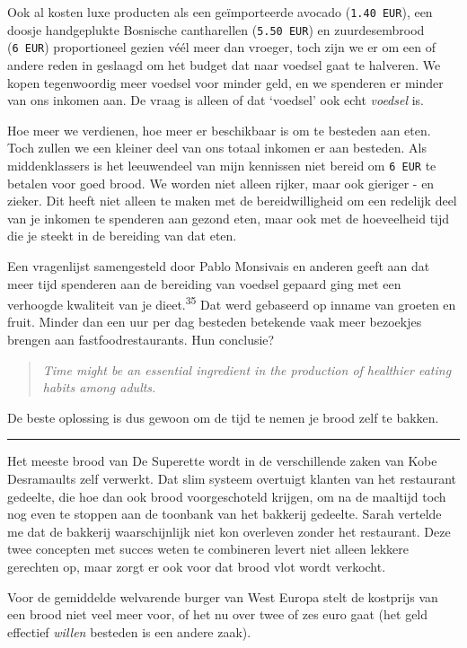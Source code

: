 \documentclass[
  11pt,
  dutch,
]{memoir}
\begin{document}
Ook al kosten luxe producten als een geïmporteerde avocado
(\texttt{1.40\ EUR}), een doosje handgeplukte Bosnische cantharellen
(\texttt{5.50\ EUR}) en zuurdesembrood (\texttt{6\ EUR}) proportioneel
gezien véél meer dan vroeger, toch zijn we er om een of andere reden in
geslaagd om het budget dat naar voedsel gaat te halveren. We kopen
tegenwoordig meer voedsel voor minder geld, en we spenderen er minder
van ons inkomen aan. De vraag is alleen of dat `voedsel' ook echt
\emph{voedsel} is.

Hoe meer we verdienen, hoe meer er beschikbaar is om te besteden aan
eten. Toch zullen we een kleiner deel van ons totaal inkomen er aan
besteden. Als middenklassers is het leeuwendeel van mijn kennissen niet
bereid om \texttt{6\ EUR} te betalen voor goed brood. We worden niet
alleen rijker, maar ook gieriger - en zieker. Dit heeft niet alleen te
maken met de bereidwilligheid om een redelijk deel van je inkomen te
spenderen aan gezond eten, maar ook met de hoeveelheid tijd die je
steekt in de bereiding van dat eten.

Een vragenlijst samengesteld door Pablo Monsivais en anderen geeft aan
dat meer tijd spenderen aan de bereiding van voedsel gepaard ging met
een verhoogde kwaliteit van je dieet.\textsuperscript{35} Dat werd
gebaseerd op inname van groeten en fruit. Minder dan een uur per dag
besteden betekende vaak meer bezoekjes brengen aan fastfoodrestaurants.
Hun conclusie?

\begin{quote}
\emph{Time might be an essential ingredient in the production of
healthier eating habits among adults.}
\end{quote}

De beste oplossing is dus gewoon om de tijd te nemen je brood zelf te
bakken.

\pfbreak

Het meeste brood van De Superette wordt in de verschillende zaken van
Kobe Desramaults zelf verwerkt. Dat slim systeem overtuigt klanten van
het restaurant gedeelte, die hoe dan ook brood voorgeschoteld krijgen,
om na de maaltijd toch nog even te stoppen aan de toonbank van het
bakkerij gedeelte. Sarah vertelde me dat de bakkerij waarschijnlijk niet
kon overleven zonder het restaurant. Deze twee concepten met succes
weten te combineren levert niet alleen lekkere gerechten op, maar zorgt
er ook voor dat brood vlot wordt verkocht.

Voor de gemiddelde welvarende burger van West Europa stelt de kostprijs
van een brood niet veel meer voor, of het nu over twee of zes euro gaat
(het geld effectief \emph{willen} besteden is een andere zaak).
\end{document}
